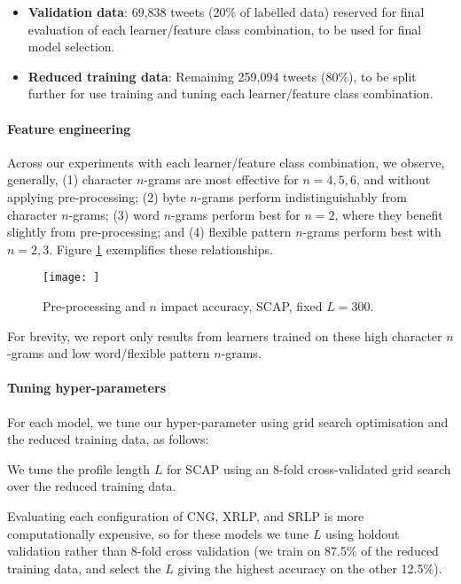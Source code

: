 \documentclass[twocolumn,10pt]{article}
\begin{document}
\begin{itemize}[itemsep=0pt,topsep=0pt]
    \item \textbf{Validation data}: 69,838 tweets (20\% of labelled data)
    reserved for final evaluation of each learner/feature class combination,
    to be used for final model selection.
    \item \textbf{Reduced training data}: Remaining 259,094 tweets (80\%),
    to be split further for use training and tuning each learner/feature
    class combination.
\end{itemize}


\paragraph{Feature engineering}

Across our experiments with each learner/feature class combination,
we observe, generally,
(1) character $n$-grams are most effective for $n=4,5,6$, and without
applying pre-processing;
(2) byte $n$-grams perform indistinguishably from character $n$-grams;
(3) word $n$-grams perform best for $n=2$, where they benefit slightly
    from pre-processing; and
(4) flexible pattern $n$-grams perform best with $n=2,3$.
Figure \ref{fig:features} exemplifies these relationships.

\begin{figure}[h]
    \centering
    \texttt{[image: ]}
    \caption{Pre-processing and $n$ impact accuracy, SCAP, fixed $L=300$.}
    \label{fig:features}
\end{figure}

For brevity, we report only results from learners trained on these high
character $n$-grams and low word/flexible pattern $n$-grams.


\paragraph{Tuning hyper-parameters}

For each model, we tune our hyper-parameter using grid search
optimisation and the reduced training data, as follows:

We tune the profile length $L$ for SCAP using an 8-fold cross-validated
grid search over the reduced training data.

Evaluating each configuration of CNG, XRLP, and SRLP is more
computationally expensive, so for these models we tune $L$ using
holdout validation rather than 8-fold cross validation
(we train on 87.5\% of the reduced training data, and select the $L$
giving the highest accuracy on the other 12.5\%).
\end{document}
